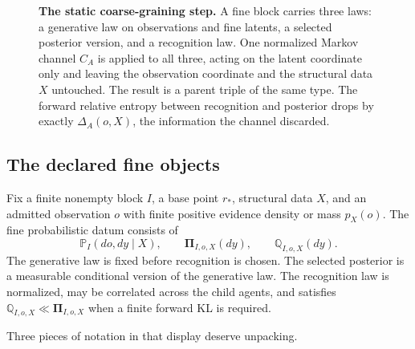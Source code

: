\documentclass[11pt,letterpaper]{article}
\newcommand{\KL}{\operatorname{KL}}
\newcommand{\Prob}{\mathbb P}
\newcommand{\Rec}{\mathbb Q}
\newcommand{\Post}{\boldsymbol\Pi}
\begin{document}
\begin{figure}[ht]
{}
\caption{\textbf{The static coarse-graining step.} A fine block carries three laws: a generative law on observations and fine latents, a selected posterior version, and a recognition law. One normalized Markov channel \(C_A\) is applied to all three, acting on the latent coordinate only and leaving the observation coordinate and the structural data \(X\) untouched. The result is a parent triple of the same type. The forward relative entropy between recognition and posterior drops by exactly \(\Delta_A(o,X)\), the information the channel discarded.}
\label{fig:parent}
\end{figure}

\subsection{The declared fine objects}

Fix a finite nonempty block \(I\), a base point \(r_*\), structural data \(X\), and an admitted observation \(o\) with finite positive evidence density or mass \(p_X(o)\). The fine probabilistic datum consists of
\[
  \Prob_I(do,dy\mid X),
  \qquad
  \Post_{I,o,X}(dy),
  \qquad
  \Rec_{I,o,X}(dy).
\]
The generative law is fixed before recognition is chosen. The selected posterior is a measurable conditional version of the generative law. The recognition law is normalized, may be correlated across the child agents, and satisfies \(\Rec_{I,o,X}\ll\Post_{I,o,X}\) when a finite forward KL is required.

Three pieces of notation in that display deserve unpacking.
\end{document}
